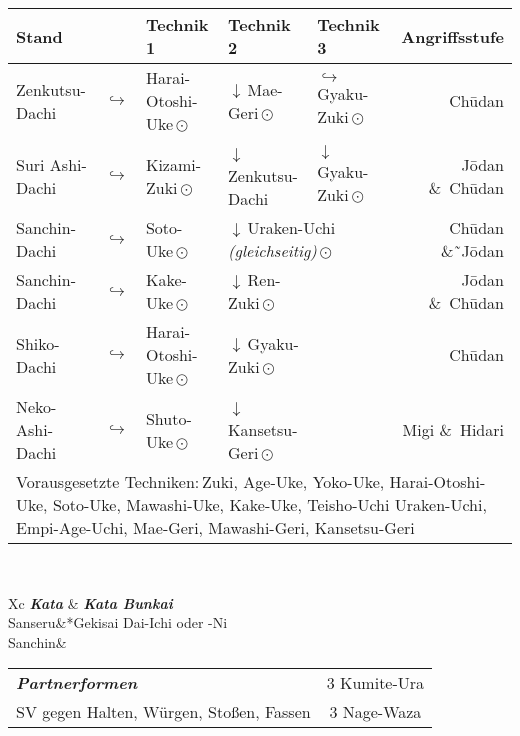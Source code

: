 \null\vfill\null
	\begin{tabularx}{\textwidth}{llllXr}
		\textbf{Stand} 	&  	& \textbf{Technik 1} & \textbf{Technik 2} 				& \textbf{Technik 3}& \textbf{Angriffsstufe}\\
		\midrule
		Zenkutsu-Dachi 	& \(\hookrightarrow\)	& Harai-Otoshi-Uke\,\(\odot\) 	& \(\downarrow\)\,Mae-Geri\,\(\odot\)	& \(\hookrightarrow\) 	 Gyaku-Zuki\,\(\odot\)	& Ch\={u}dan \\
		Suri Ashi-Dachi	& \(\hookrightarrow\)	& Kizami-Zuki\,\(\odot\)		& \(\downarrow\)\,Zenkutsu-Dachi & \(\downarrow\)	 Gyaku-Zuki\,\(\odot\)	& J\={o}dan \&~Ch\={u}dan \\
		Sanchin-Dachi 	& \(\hookrightarrow\)	& Soto-Uke\,\(\odot\) 			&\multicolumn{2}{l}{ \(\downarrow\)\,Uraken-Uchi {\footnotesize \textit{(gleichseitig)}}\,\(\odot\) 				}						&	 					 Ch\={u}dan \&˜J\={o}dan\\
		Sanchin-Dachi 	& \(\hookrightarrow\)	& Kake-Uke\,\(\odot\) 			& \(\downarrow\)\,Ren-Zuki\,\(\odot\) 					&						& 						 J\={o}dan \&~Ch\={u}dan \\
		Shiko-Dachi 	& \(\hookrightarrow\)	& Harai-Otoshi-Uke\,\(\odot\) 	& \(\downarrow\)\,Gyaku-Zuki\,\(\odot\) 				&						& 						 Ch\={u}dan \\
		Neko-Ashi-Dachi	& \(\hookrightarrow\)	& Shuto-Uke\,\(\odot\) 			& \(\downarrow\)\,Kansetsu-Geri\,\(\odot\) 					&						& 						 Migi \&~Hidari  \\
		\midrule
		\multicolumn{6}{p{\linewidth-2\tabcolsep}}{{\footnotesize Vorausgesetzte Techniken:\,Zuki, Age-Uke, Yoko-Uke, Harai-Otoshi-Uke, Soto-Uke, Mawashi-Uke, Kake-Uke, Teisho-Uchi Uraken-Uchi, Empi-Age-Uchi, Mae-Geri, Mawashi-Geri, Kansetsu-Geri}}\\
		\midrule
	\end{tabularx}\\
	\null\vfill\null
	\begin{minipage}[t]{0.48\textwidth}
			\begin{tabularx}{\textwidth}{Xc}
				\textbf{\textit{Kata}} & \textbf{\textit{Kata Bunkai}} \\
				Sanseru&*{Gekisai Dai-Ichi oder -Ni}\\
				Sanchin& \\
			\end{tabularx}
		\end{minipage}
	\null\hfill\null
	\begin{minipage}[t]{0.48\textwidth}
		\begin{tabularx}{\textwidth}{Xc}
			{\textbf{\textit{Partnerformen}}} & 3 Kumite-Ura\\
			SV gegen Halten, Würgen, Stoßen, Fassen & 3 Nage-Waza  \\
		\end{tabularx}
	\end{minipage}\\
